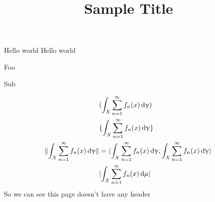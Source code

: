 \documentclass{article}
\title{Sample Title}
\newcommand\bigstuff[1]{\int_X \sum_{n=1}^\infty f_n(x) \, \mathrm{d} #1}
\begin{document}
 Hello world
 Hello world
\begin{dzenum}
  \item Foo
  \item
    \begin{dzenum}
      \item Sub
      \item
    \end{dzenum}
\end{dzenum}
\pagehline
\begin{align*}
  &\parens{\bigstuff{\gamma}} \\
  &\braces{\bigstuff{\gamma*}} \\
  \norm{\bigstuff{\gamma}} &= \iprod{\bigstuff{\gamma*}}{\bigstuff{\gamma}} \\
  &\abs{\bigstuff{\mu}}
\end{align*}
\newpage
So we can see this page doesn't have any header
\newpage
\end{document}
